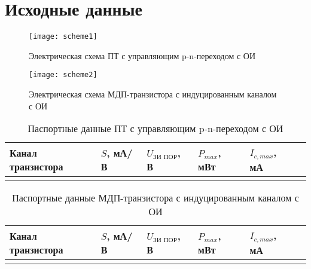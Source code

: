 \section{Исходные данные}

\begin{figure}[h]
  \begin{minipage}[h]{0.45\linewidth}
    \texttt{[image: scheme1]}
    \caption{Электрическая схема ПТ с управляющим p-n-переходом с ОИ}
  \end{minipage}
  \hfill   
  \begin{minipage}[h]{0.45\linewidth}
    \vspace{4mm}
    \texttt{[image: scheme2]}
    \caption{Электрическая схема МДП-транзистора с индуцированным каналом с ОИ}
  \end{minipage}   
\end{figure}

\begin{table} [htbp]
  \caption{Паспортные данные ПТ с управляющим p-n-переходом с ОИ}
  \begin{tabular}{| p{2.7cm} | p{2.7cm} | p{2.7cm} | p{2.7cm} | p{2.7cm}l | }
    \hline
    \centering Канал транзистора & 
    \centering $ S $, мА/В & 
    \centering $ U_{\text{ЗИ ПОР}} $, В &
    \centering $ P_{max} $, мВт & 
    \centering $ I_{c, max} $, мА &
    \\
    \hline
    & & & & & \\
    \hline
  \end{tabular}
\end{table}

\begin{table} [htbp]
  \caption{Паспортные данные МДП-транзистора с индуцированным каналом с ОИ}
  \begin{tabular}{| p{2.7cm} | p{2.7cm} | p{2.7cm} | p{2.7cm} | p{2.7cm}l | }
    \hline
    \centering Канал транзистора & 
    \centering $ S $, мА/В & 
    \centering $ U_{\text{ЗИ ПОР}} $, В &
    \centering $ P_{max} $, мВт & 
    \centering $ I_{c, max} $, мА &
    \\
    \hline
    & & & & & \\
    \hline
  \end{tabular}
\end{table}



\clearpage